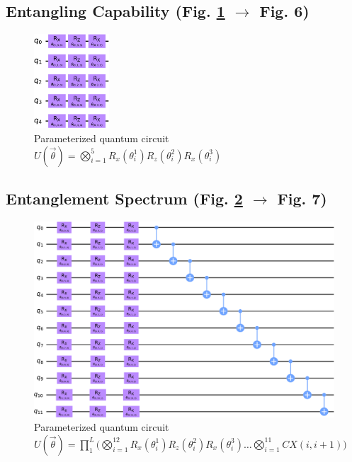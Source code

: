 \subsection{Entangling Capability (Fig. \ref{fig:entg-circuit} $\rightarrow$ Fig. 6)}
\begin{figure}[!h]
    \centering
    \includegraphics[width=0.25\textwidth]{figures/qleet/entg_circuit.pdf}
    \caption[Parameterized Quantum Circuit for a Unitary $U_2(\theta)$.]{Parameterized quantum circuit $U(\vec{\theta}) = \bigotimes_{i=1}^{5}R_x(\theta_i^1)R_z(\theta_i^2)R_x(\theta_i^3)$}
    \label{fig:entg-circuit}
\end{figure}

\subsection{Entanglement Spectrum (Fig. \ref{fig:spec-circuit} $\rightarrow$ Fig. 7)}
\begin{figure}[!h]
    \centering
    \includegraphics[width=\textwidth]{figures/qleet/spec_circuit.pdf}
    \caption[Parameterized Quantum Circuit for a Unitary $U_3(\theta)$.]{Parameterized quantum circuit $U(\vec{\theta}) = \prod_{1}^{L}\big(\bigotimes_{i=1}^{12}R_x(\theta_i^1)R_z(\theta_i^2)R_x(\theta_i^3) \ldots \bigotimes_{i=1}^{11}CX(i, i+1)\big)$}
    \label{fig:spec-circuit}
\end{figure}
